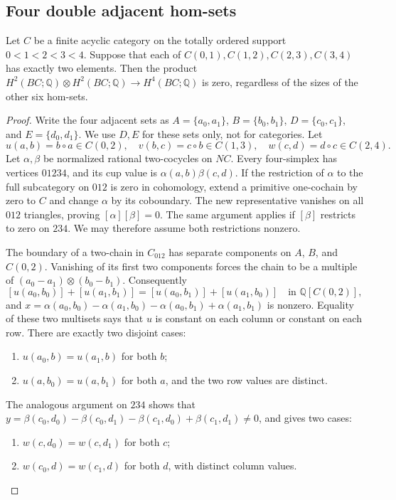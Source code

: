 \subsection{Four double adjacent hom-sets}
\begin{proposition}[Proved]\label{A7:four-double}
Let $C$ be a finite acyclic category on the totally ordered support
$0<1<2<3<4$. Suppose that each of $C(0,1),C(1,2),C(2,3),C(3,4)$
has exactly two elements. Then the product
$H^2(BC;\mathbb Q)\otimes H^2(BC;\mathbb Q)\longrightarrow H^4(BC;\mathbb Q)$
is zero, regardless of the sizes of the other six hom-sets.
\end{proposition}
\begin{proof}
Write the four adjacent sets as $A=\{a_0,a_1\}$,
$B=\{b_0,b_1\}$, $D=\{c_0,c_1\}$, and $E=\{d_0,d_1\}$.
We use $D,E$ for these sets only, not for categories. Let
\[
 u(a,b)=b\circ a\in C(0,2),\quad
 v(b,c)=c\circ b\in C(1,3),\quad
 w(c,d)=d\circ c\in C(2,4).
\]
Let $\alpha,\beta$ be normalized rational two-cocycles on $NC$.
Every four-simplex has vertices $01234$, and its cup value is
$\alpha(a,b)\beta(c,d)$. If the restriction of $\alpha$ to the
full subcategory on $012$ is zero in cohomology, extend a primitive
one-cochain by zero to $C$ and change $\alpha$ by its coboundary.
The new representative vanishes on all $012$ triangles, proving
$[\alpha][\beta]=0$. The same argument applies if $[\beta]$ restricts
to zero on $234$. We may therefore assume both restrictions nonzero.

The boundary of a two-chain in $C_{012}$ has separate components on
$A$, $B$, and $C(0,2)$. Vanishing of its first two components forces
the chain to be a multiple of
$(a_0-a_1)\otimes(b_0-b_1)$. Consequently
\[
 [u(a_0,b_0)]+[u(a_1,b_1)]
 =[u(a_0,b_1)]+[u(a_1,b_0)]
 \quad\text{in }\mathbb Q[C(0,2)],
\]
and $x=\alpha(a_0,b_0)-\alpha(a_1,b_0)
-\alpha(a_0,b_1)+\alpha(a_1,b_1)$ is nonzero.
Equality of these two multisets says that $u$ is constant on each
column or constant on each row. There are exactly two disjoint cases:
\begin{enumerate}
\item[(U0)] $u(a_0,b)=u(a_1,b)$ for both $b$;
\item[(U1)] $u(a,b_0)=u(a,b_1)$ for both $a$, and the two row values
are distinct.
\end{enumerate}
The analogous argument on $234$ shows that
$y=\beta(c_0,d_0)-\beta(c_0,d_1)
-\beta(c_1,d_0)+\beta(c_1,d_1)\ne0$, and gives two cases:
\begin{enumerate}
\item[(W0)] $w(c,d_0)=w(c,d_1)$ for both $c$;
\item[(W1)] $w(c_0,d)=w(c_1,d)$ for both $d$, with distinct column values.
\end{enumerate}


\end{proof}
